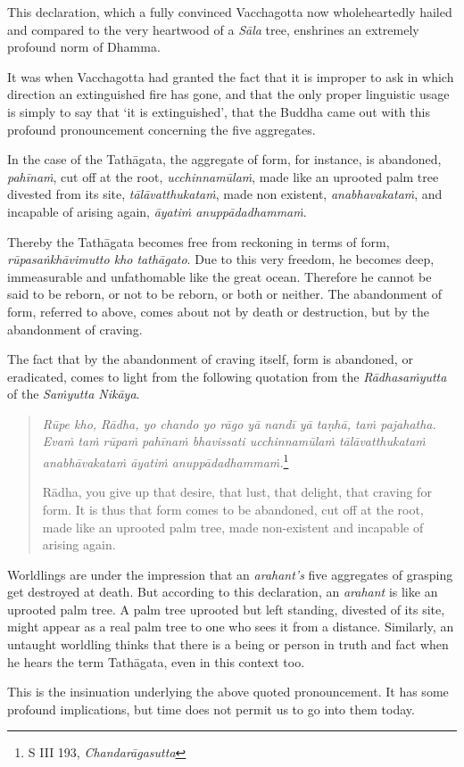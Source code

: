 This declaration, which a fully convinced Vacchagotta now wholeheartedly hailed and compared to the very heartwood of a \emph{Sāla} tree, enshrines an extremely profound norm of Dhamma.

It was when Vacchagotta had granted the fact that it is improper to ask in which direction an extinguished fire has gone, and that the only proper linguistic usage is simply to say that `it is extinguished', that the Buddha came out with this profound pronouncement concerning the five aggregates.

In the case of the Tathāgata, the aggregate of form, for instance, is abandoned, \emph{pahīnaṁ}, cut off at the root, \emph{ucchinnamūlaṁ}, made like an uprooted palm tree divested from its site, \emph{tālāvatthukataṁ}, made non existent, \emph{anabhavakataṁ}, and incapable of arising again, \emph{āyatiṁ anuppādadhammaṁ}.

Thereby the Tathāgata becomes free from reckoning in terms of form, \emph{rūpasaṅkhāvimutto kho tathāgato}. Due to this very freedom, he becomes deep, immeasurable and unfathomable like the great ocean. Therefore he cannot be said to be reborn, or not to be reborn, or both or neither. The abandonment of form, referred to above, comes about not by death or destruction, but by the abandonment of craving.

The fact that by the abandonment of craving itself, form is abandoned, or eradicated, comes to light from the following quotation from the \emph{Rādhasaṁyutta} of the \emph{Saṁyutta Nikāya}.

\begin{quote}
\emph{Rūpe kho, Rādha, yo chando yo rāgo yā nandī yā taṇhā, taṁ pajahatha. Evaṁ taṁ rūpaṁ pahīnaṁ bhavissati ucchinnamūlaṁ tālāvatthukataṁ anabhāvakataṁ āyatiṁ anuppādadhammaṁ.}\footnote{S III 193, \emph{Chandarāgasutta}}

Rādha, you give up that desire, that lust, that delight, that craving for form. It is thus that form comes to be abandoned, cut off at the root, made like an uprooted palm tree, made non-existent and incapable of arising again.
\end{quote}

Worldlings are under the impression that an \emph{arahant's} five aggregates of grasping get destroyed at death. But according to this declaration, an \emph{arahant} is like an uprooted palm tree. A palm tree uprooted but left standing, divested of its site, might appear as a real palm tree to one who sees it from a distance. Similarly, an untaught worldling thinks that there is a being or person in truth and fact when he hears the term Tathāgata, even in this context too.

This is the insinuation underlying the above quoted pronouncement. It has some profound implications, but time does not permit us to go into them today.

